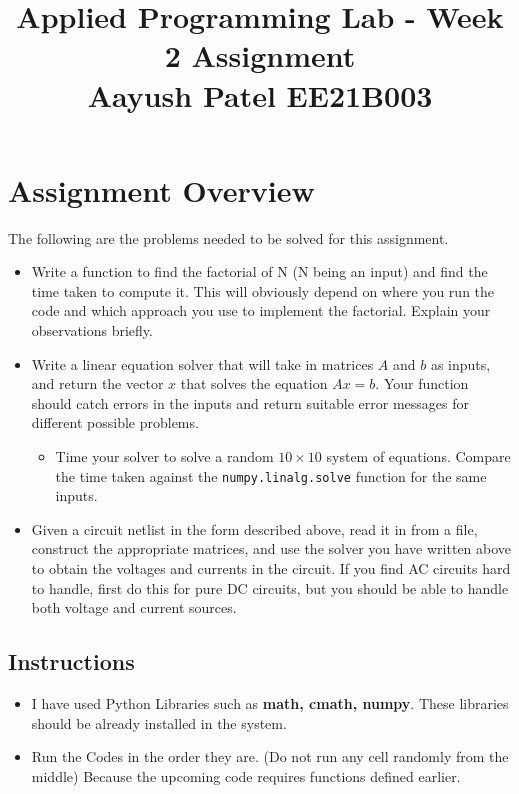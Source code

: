 \documentclass[11pt]{article}
\title{Applied Programming Lab - Week 2 Assignment \\
    Aayush Patel EE21B003
    }
\providecommand{\tightlist}{%
      \setlength{\itemsep}{0pt}\setlength{\parskip}{0pt}}
\begin{document}
    
    \maketitle
    
    

    
    \hypertarget{assignment-overview}{%
\section{Assignment Overview}\label{assignment-overview}}

The following are the problems needed to be solved for this assignment.

\begin{itemize}
\tightlist
\item
  Write a function to find the factorial of N (N being an input) and
  find the time taken to compute it. This will obviously depend on where
  you run the code and which approach you use to implement the
  factorial. Explain your observations briefly.
\item
  Write a linear equation solver that will take in matrices \(A\) and
  \(b\) as inputs, and return the vector \(x\) that solves the equation
  \(Ax=b\). Your function should catch errors in the inputs and return
  suitable error messages for different possible problems.

  \begin{itemize}
  \tightlist
  \item
    Time your solver to solve a random \(10\times 10\) system of
    equations. Compare the time taken against the
    \texttt{numpy.linalg.solve} function for the same inputs.
  \end{itemize}
\item
  Given a circuit netlist in the form described above, read it in from a
  file, construct the appropriate matrices, and use the solver you have
  written above to obtain the voltages and currents in the circuit. If
  you find AC circuits hard to handle, first do this for pure DC
  circuits, but you should be able to handle both voltage and current
  sources.
\end{itemize}

    \hypertarget{instructions}{%
\subsection{Instructions}\label{instructions}}

\begin{itemize}
\tightlist
\item
  I have used Python Libraries such as \textbf{math, cmath, numpy}.
  These libraries should be already installed in the system.
\item
  Run the Codes in the order they are. (Do not run any cell randomly
  from the middle) Because the upcoming code requires functions defined
  earlier.
\end{itemize}
\end{document}
